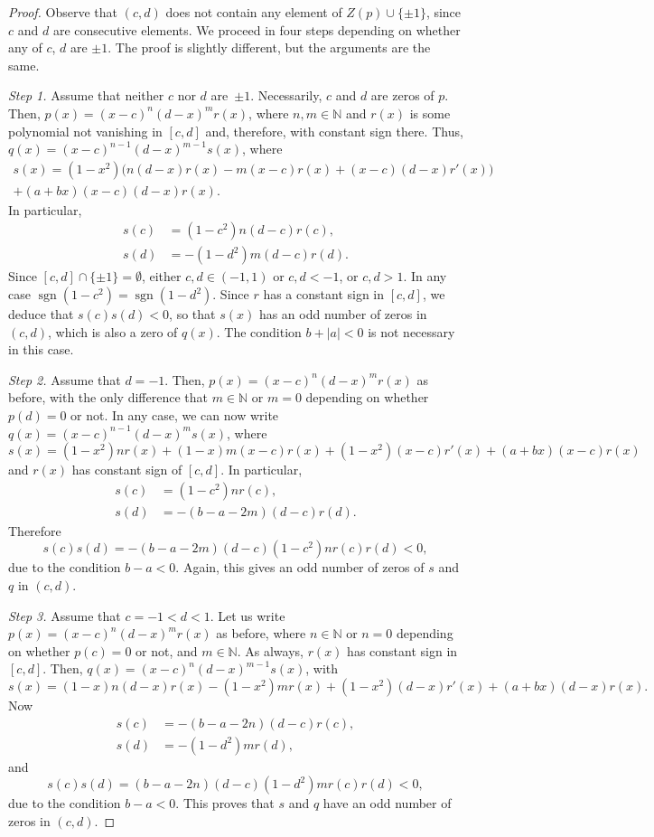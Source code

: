 \documentclass[10pt, a4paper, leqno]{amsart}
\numberwithin{equation}{section}
\theoremstyle{plain}
\theoremstyle{remark}
\newcommand{\NN}{\mathbb{N}}
\newcommand{\sgn}{\operatorname{sgn}}
\begin{document}
\begin{proof}
Observe that $(c,d)$ does not contain any element of $Z(p) \cup \{\pm 1\}$, since $c$ and $d$ are consecutive elements.
We proceed in four steps depending on whether any of $c$, $d$ are $\pm 1$. The proof is slightly different, but the arguments are the same.

\medskip
\noindent
\textit{Step 1.} 
Assume that neither $c$ nor $d$ are~$\pm 1$. Necessarily, $c$ and $d$ are zeros of $p$. Then, $p(x) = (x-c)^n (d-x)^m r(x)$, where $n, m \in \NN$ and $r(x)$ is some polynomial not vanishing in $[c,d]$ and, therefore, with constant sign there. Thus, $q(x) = (x-c)^{n-1} (d-x)^{m-1} s(x)$, where
\begin{multline*}
  s(x) = (1-x^2) \Big( n(d-x) r(x) - m(x-c)r(x) + (x-c)(d-x) r'(x) \Big)
  \\
  + (a+bx)(x-c)(d-x)r(x).
\end{multline*}
In particular,
\begin{align*}
  s(c) &= (1-c^2) n (d-c) r(c),
  \\
  s(d) &= - (1-d^2) m (d-c) r(d).
\end{align*}
Since $[c, d ] \cap \{\pm 1\} = \emptyset$, either $c, d \in (-1,1)$ or $c, d < -1$, or $c, d > 1$. In any case $\sgn(1-c^2) = \sgn(1-d^2)$. Since $r$ has a constant sign in $[c,d]$, we deduce that $s(c) s(d) < 0$, so that $s(x)$ has an odd number of zeros in $(c,d)$, which is also a zero of $q(x)$. The condition $b + |a| < 0$ is not necessary in this case.

\medskip
\noindent
\textit{Step 2.} 
Assume that $d = -1$. Then, $p(x) = (x-c)^n (d-x)^m r(x)$ as before, with the only difference that $m \in \NN$ or $m = 0$ depending on whether $p(d) = 0$ or not. In any case, we can now write $q(x) = (x-c)^{n-1} (d-x)^m s(x)$, where
\[
  s(x) = (1-x^2) n r(x) + (1-x)m(x-c)r(x) + (1-x^2)(x-c) r'(x)
  + (a+bx)(x-c) r(x)
\]
and $r(x)$ has constant sign of $[c,d]$. In particular,
\begin{align*}
  s(c) &= (1-c^2) n r(c),
  \\
  s(d) &= - (b-a-2m) (d-c) r(d).
\end{align*}
Therefore
\[
  s(c) s(d) = - (b-a-2m) (d-c) (1-c^2) n r(c) r(d) < 0,
\]
due to the condition $b - a < 0$. Again, this gives an odd number of zeros of $s$ and $q$ in $(c,d)$.

\medskip
\noindent
\textit{Step 3.} 
Assume that $c = -1 < d < 1$. Let us write $p(x) = (x-c)^n (d-x)^m r(x)$ as before, where $n \in \NN$ or $n = 0$ depending on whether $p(c) = 0$ or not, and $m \in \NN$. As always, $r(x)$ has constant sign in $[c,d]$. Then, $q(x) = (x-c)^n (d-x)^{m-1} s(x)$, with
\[
  s(x) = (1-x) n(d-x) r(x) - (1-x^2) m r(x) + (1-x^2) (d-x) r'(x)
  + (a+bx)(d-x)r(x).
\]
Now
\begin{align*}
  s(c) &= - (b-a-2n) (d-c) r(c),
  \\
  s(d) &= - (1-d^2) m r(d),
\end{align*}
and
\[
  s(c) s(d) = (b-a-2n) (d-c) (1-d^2) m r(c) r(d) < 0,
\]
due to the condition $b - a < 0$. This proves that $s$ and $q$ have an odd number of zeros in $(c,d)$.


\end{proof}
\end{document}
